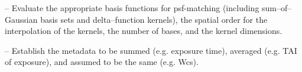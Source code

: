 \documentclass[prd, nofootinbib, floatfix, 11pt,tightenlines,times]{article}
\def\arcsec{^{\prime\prime}}
\begin{document}
-- Evaluate the appropriate basis functions for psf-matching
(including sum--of--Gaussian basis sets and delta--function kernels),
the spatial order for the interpolation of the kernels,  the
number of bases, and the kernel dimensions.


-- Establish the metadata to be summed (e.g. exposure time), averaged
(e.g. TAI of exposure), and assumed to be the same (e.g. Wcs).




%





%
\end{document}
